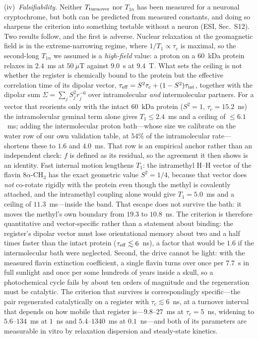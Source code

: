 \documentclass[aps,prx,reprint,superscriptaddress,nofootinbib,floatfix]{revtex4-2}
\begin{document}
(iv)~\emph{Falsifiability.} Neither $T_{\rm turnover}$ nor $T_{1n}$ has been
measured for a neuronal cryptochrome, but both can be predicted from measured
constants, and doing so sharpens the criterion into something testable without a
neuron (ESI, Sec.~S12). Two results follow, and the first is
adverse. Nuclear relaxation at the geomagnetic field is in the extreme-narrowing
regime, where $1/T_1\propto\tau_c$ is maximal, so the second-long $T_{1n}$ we
assumed is a \emph{high-field} value: a proton on a $60$~kDa protein relaxes in
$2.4$~ms at $50~\mu$T against $9.0$~s at $9.4$~T. What sets the ceiling is not
whether the register is chemically bound to the protein but the effective
correlation time of its dipolar vector,
$\tau_{\rm eff}=S^2\tau_c+(1-S^2)\tau_{\rm int}$, together with the dipolar sum
$\Sigma=\sum_j S_j^2 r_j^{-6}$ over intramolecular \emph{and} intermolecular
partners. For a vector that reorients only with the intact $60$~kDa protein
($S^2=1$, $\tau_c=15.2$~ns) the intramolecular geminal term alone gives
$T_1\le2.4$~ms and a ceiling of $\le6.1$~ms; adding the intermolecular proton
bath---whose size we calibrate on the water row of our own validation table, at
$54\%$ of the intramolecular rate---shortens these to $1.6$ and $4.0$~ms. That
row is an empirical anchor rather than an independent check: $f$ is defined as
its residual, so the agreement it then shows is an identity. Fast
internal motion lengthens $T_1$: the intramethyl H--H vector of the flavin
$8\alpha$-CH$_3$ has the exact geometric value $S^2=1/4$, because that vector does
\emph{not} co-rotate rigidly with the protein even though the methyl is
covalently attached, and the intramethyl coupling alone would give $T_1=5.0$~ms
and a ceiling of $11.3$~ms---inside the band. That escape does not survive the
bath: it moves the methyl's own boundary from $19.3$ to $10.8$~ns. The criterion is
therefore quantitative and vector-specific rather than a statement about binding:
the register's dipolar vector must lose orientational memory about two and a
half times faster than the intact protein ($\tau_{\rm eff}\lesssim6$~ns), a factor
that would be $1.6$ if the intermolecular bath were neglected. Second, the drive cannot be light: with the
measured flavin extinction coefficient, a single flavin turns over once per
$7.7$~s in full sunlight and once per some hundreds of years inside a skull, so a
photochemical cycle fails by about ten orders of magnitude and the regeneration
must be catalytic. The criterion that survives is correspondingly specific---the
pair regenerated catalytically on a register with $\tau_c\lesssim6$~ns, at a
turnover interval that depends on how mobile that register is---$9.8$--$27$~ms at
$\tau_c=5$~ns, widening to $5.6$--$134$~ms at $1$~ns and $5.4$--$1340$~ms at
$0.1$~ns---and both of its parameters are measurable in vitro by
relaxation dispersion and steady-state kinetics.
\end{document}
